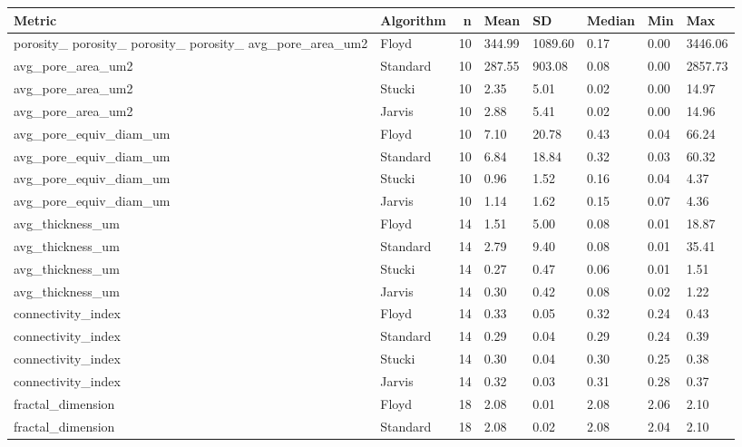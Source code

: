 \begin{tabular}{llrlllll}
\toprule
Metric & Algorithm & n & Mean & SD & Median & Min & Max \\
\midrule
porosity_%
porosity_%
porosity_%
porosity_%
avg_pore_area_um2 & Floyd & 10 & 344.99 & 1089.60 & 0.17 & 0.00 & 3446.06 \\
avg_pore_area_um2 & Standard & 10 & 287.55 & 903.08 & 0.08 & 0.00 & 2857.73 \\
avg_pore_area_um2 & Stucki & 10 & 2.35 & 5.01 & 0.02 & 0.00 & 14.97 \\
avg_pore_area_um2 & Jarvis & 10 & 2.88 & 5.41 & 0.02 & 0.00 & 14.96 \\
avg_pore_equiv_diam_um & Floyd & 10 & 7.10 & 20.78 & 0.43 & 0.04 & 66.24 \\
avg_pore_equiv_diam_um & Standard & 10 & 6.84 & 18.84 & 0.32 & 0.03 & 60.32 \\
avg_pore_equiv_diam_um & Stucki & 10 & 0.96 & 1.52 & 0.16 & 0.04 & 4.37 \\
avg_pore_equiv_diam_um & Jarvis & 10 & 1.14 & 1.62 & 0.15 & 0.07 & 4.36 \\
avg_thickness_um & Floyd & 14 & 1.51 & 5.00 & 0.08 & 0.01 & 18.87 \\
avg_thickness_um & Standard & 14 & 2.79 & 9.40 & 0.08 & 0.01 & 35.41 \\
avg_thickness_um & Stucki & 14 & 0.27 & 0.47 & 0.06 & 0.01 & 1.51 \\
avg_thickness_um & Jarvis & 14 & 0.30 & 0.42 & 0.08 & 0.02 & 1.22 \\
connectivity_index & Floyd & 14 & 0.33 & 0.05 & 0.32 & 0.24 & 0.43 \\
connectivity_index & Standard & 14 & 0.29 & 0.04 & 0.29 & 0.24 & 0.39 \\
connectivity_index & Stucki & 14 & 0.30 & 0.04 & 0.30 & 0.25 & 0.38 \\
connectivity_index & Jarvis & 14 & 0.32 & 0.03 & 0.31 & 0.28 & 0.37 \\
fractal_dimension & Floyd & 18 & 2.08 & 0.01 & 2.08 & 2.06 & 2.10 \\
fractal_dimension & Standard & 18 & 2.08 & 0.02 & 2.08 & 2.04 & 2.10 \\

\end{tabular}
